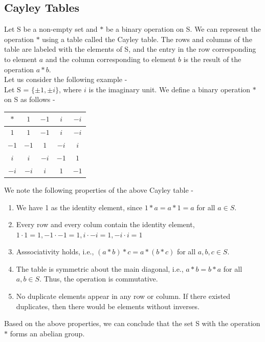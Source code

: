 \documentclass[openany]{book}
\begin{document}
\subsection{Cayley Tables}
Let S be a non-empty set and $*$ be a binary operation on S. We can represent the operation $*$ using a table called the Cayley table. The rows and columns of the table are labeled with the elements of S, and the entry in the row corresponding to element $a$ and the column corresponding to element $b$ is the result of the operation $a * b$. \\
Let us consider the following example - \\
Let S = $\{ \pm 1, \pm i \}$, where $i$ is the imaginary unit. We define a binary operation $*$ on S as follows -
\begin{center}
\begin{tabular}{c|c|c|c|c|}
    $*$ & $1$ & $-1$ & $i$ & $-i$ \\
    \hline
    $1$ & $1$ & $-1$ & $i$ & $-i$ \\
    $-1$ & $-1$ & $1$ & $-i$ & $i$ \\
    $i$ & $i$ & $-i$ & $-1$ & $1$ \\
    $-i$ & $-i$ & $i$ & $1$ & $-1$ \\
\end{tabular}
\end{center}
\begin{mynote}
    We note the following properties of the above Cayley table -
    \begin{enumerate}
        \item We have 1 as the identity element, since $1 * a = a * 1 = a$ for all $a \in S$.
        \item Every row and every colum contain the identity element, $1 \cdot 1 = 1, -1 \cdot -1 = 1, i \cdot -i = 1, -i \cdot i = 1$
        \item Asssociativity holds, i.e., $(a * b) * c = a * (b * c)$ for all $a, b, c \in S$.
        \item The table is symmetric about the main diagonal, i.e., $a * b = b * a$ for all $a, b \in S$. Thus, the operation is commutative.
        \item No duplicate elements appear in any row or column. If there existed duplicates, then there would be elements without inverses.
    \end{enumerate}
    Based on the above properties, we can conclude that the set S with the operation $*$ forms an abelian group.
\end{mynote}
\end{document}
